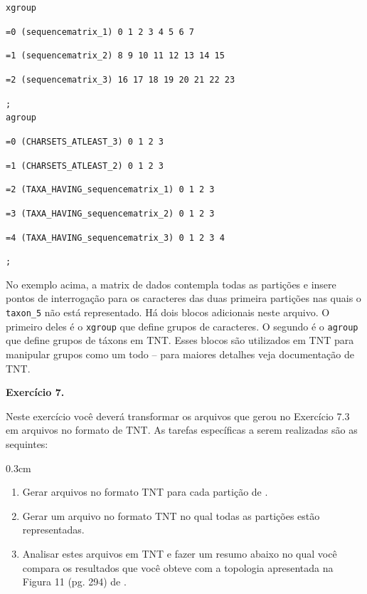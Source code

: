 \begin{refsection}
\noindent\texttt{xgroup}

\noindent\texttt{=0~(sequencematrix\_1)	0~1~2~3~4~5~6~7~}

\noindent\texttt{=1~(sequencematrix\_2)	8~9~10~11~12~13~14~15~}

\noindent\texttt{=2~(sequencematrix\_3)	16~17~18~19~20~21~22~23~}

\noindent\texttt{;}\\

\noindent\texttt{agroup}

\noindent\texttt{=0~(CHARSETS\_ATLEAST\_3)~0~1~2~3}

\noindent\texttt{=1~(CHARSETS\_ATLEAST\_2)~0~1~2~3}

\noindent\texttt{=2~(TAXA\_HAVING\_sequencematrix\_1)~0~1~2~3}

\noindent\texttt{=3~(TAXA\_HAVING\_sequencematrix\_2)~0~1~2~3}

\noindent\texttt{=4~(TAXA\_HAVING\_sequencematrix\_3)~0~1~2~3~4}

\noindent\texttt{;}


\normalsize

No exemplo acima, a matrix de dados contempla todas as partições e insere pontos de interrogação para os caracteres das duas primeira partições nas quais o \texttt{taxon\_5} não está representado. Há dois blocos adicionais neste arquivo. O primeiro deles é o \texttt{xgroup} que define grupos de caracteres. O segundo é o \texttt{agroup} que define grupos de táxons em TNT. Esses blocos são utilizados em TNT para manipular grupos como um todo -- para maiores detalhes veja documentação de TNT.\\


\begin{blackBlock}{\textbf{Exercício 7.}}\label{tut7:ex:ex4}

Neste exercício você deverá transformar os arquivos que gerou no Exercício 7.3 em arquivos no formato de TNT. As tarefas específicas a serem realizadas são as sequintes:

\end{blackBlock}

\begin {myindentpar}{0.3cm}
\begin{enumerate}[\itshape i.]
	\item{Gerar arquivos no formato TNT para cada partição de \textcite{dias_et_al_2013}.}
	\item{Gerar um arquivo no formato TNT no qual todas as partições estão representadas.}
	\item{Analisar estes arquivos em TNT e fazer um resumo abaixo no qual você compara os resultados que você obteve com a topologia apresentada na Figura 11 (pg. 294) de \textcite{dias_et_al_2013}.}
\end{enumerate}
\end{myindentpar}


\end{refsection}

